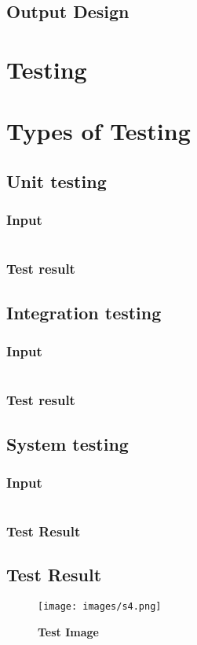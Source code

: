 \documentclass[10pt]{report}
\begin{document}
\subsection{Output Design}
\section{Testing}
\section{Types of Testing}
\subsection{Unit testing}
\subsubsection{Input}
\begin{lstlisting}
\end{lstlisting}
\subsubsection{Test result}
\subsection{Integration testing}
\subsubsection{Input}
\begin{lstlisting}
\end{lstlisting}
\subsubsection{Test result}
\subsection{System testing}
\subsubsection{Input}
\begin{lstlisting}
\end{lstlisting}
\subsubsection{Test Result}
\newpage
\subsection{Test Result}
\begin{figure}[H]
 \centering
 \texttt{[image: images/s4.png]}
 \caption{\textbf{Test Image}}
\end{figure}
\end{document}

